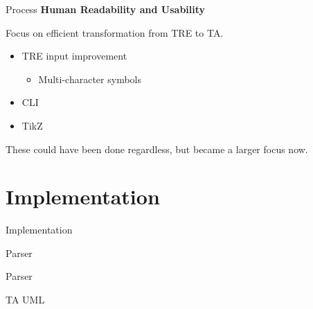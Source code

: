\begin{frame}{Process}
    \textbf{Human Readability and Usability}

    Focus on efficient transformation from TRE to TA.
    \newline
    \begin{itemize}
        \item TRE input improvement
        \begin{itemize}
            \item Multi-character symbols
        \end{itemize}
        \item CLI
        \item TikZ
    \end{itemize}

    These could have been done regardless, but became a larger focus now.
\end{frame}

\section{Implementation}

\begin{frame}[shrink=5]{Implementation}
    \begin{center}
      
    \end{center}
\end{frame}

\begin{frame}[shrink=20]{Parser}
    
\end{frame}

\begin{frame}{Parser}
    
\end{frame}

\begin{frame}{TA UML}
    
\end{frame}

